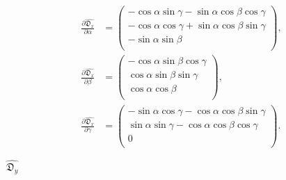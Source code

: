 \documentclass[a4paper,11pt,twoside,openright]{book}
\def\lthtmlcheckvsize{\ifdim\ht\sizebox<\vsize 
  \ifdim\wd\sizebox<\hsize\expandafter\hfill\fi \expandafter\vfill
  \else\expandafter\vss\fi}%
\begin{document}
{\newpage\clearpage
\setcounter{equation}{173}
%
\begin{subequations}\begin{align}
\frac{\partial \widehat{\mathfrak{D}_x}}{\partial \alpha} &= \begin{pmatrix}
-\cos \alpha \sin \gamma - \sin \alpha \cos \beta \cos \gamma \\
-\cos \alpha \cos \gamma + \sin \alpha \cos \beta \sin \gamma \\
-\sin \alpha \sin \beta \\
\end{pmatrix}, \\
\frac{\partial \widehat{\mathfrak{D}_x}}{\partial \beta} &= \begin{pmatrix}
-\cos \alpha \sin \beta \cos \gamma \\
\cos \alpha \sin \beta \sin \gamma \\
\cos \alpha \cos \beta \\
\end{pmatrix}, \\
\frac{\partial \widehat{\mathfrak{D}_x}}{\partial \gamma} &= \begin{pmatrix}
-\sin \alpha \cos \gamma - \cos \alpha \cos \beta \sin \gamma \\
\sin \alpha \sin \gamma - \cos \alpha \cos \beta \cos \gamma \\
0 \\
\end{pmatrix}.
\end{align}\end{subequations}%
\lthtmldisplayZ
\lthtmlcheckvsize\clearpage}

{\newpage\clearpage
{}%
$ \widehat{{\mathfrak{D}_y}}$%
\lthtmlindisplaymathZ
\lthtmlcheckvsize\clearpage}
\end{document}
